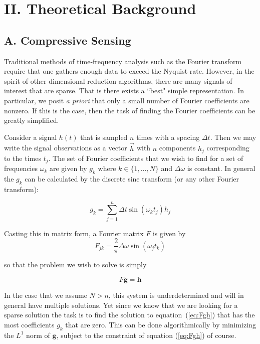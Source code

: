 \documentclass[11pt]{article}
\begin{document}

\section*{II.	Theoretical Background}	%
\subsection*{A.	Compressive Sensing}	%

\par Traditional methods of time-frequency analysis such as the Fourier transform require that one gathers enough data to exceed the Nyquist rate. However, in the spirit of other dimensional reduction algorithms, there are many signals of interest that are sparse. That is there exists a ``best" simple representation. In particular, we posit \textit{a priori} that only a small number of Fourier coefficients are nonzero. If this is the case, then the task of finding the Fourier coefficients can be greatly simplified. \\

\par Consider a signal $h(t)$ that is sampled $n$ times with a spacing $\Delta t$. Then we may write the signal observations as a vector $\vec{h}$ with $n$ components $h_{j}$ corresponding to the times $t_{j}$. The set of Fourier coefficients that we wish to find for a set of frequencies $\omega_{k}$ are given by $g_{k}$ where $k \in \{1,...,N\}$ and $\Delta \omega$ is constant. In general the $g_{k}$ can be calculated by the discrete sine transform (or any other Fourier transform):

\begin{equation}\label{eq:dst}
    g_{k} = \sum_{j=1}^{n} \Delta t \sin(\omega_{k}t_{j})h_{j}
\end{equation}

Casting this in matrix form, a Fourier matrix $F$ is given by
\begin{equation}\label{eq:idst}
    F_{jk} = \frac{2}{\pi}\Delta \omega \sin(\omega_{j}t_{k})
\end{equation}

so that the problem we wish to solve is simply

\begin{equation}\label{eq:Fgh}
    F \mathbf{g} = \mathbf{h}
\end{equation}

In the case that we assume $N > n$, this system is underdetermined and will in general have multiple solutions. Yet since we know that we are looking for a sparse solution the task is to find the solution to equation~(\ref{eq:Fgh}) that has the most coefficients $g_{k}$ that are zero. This can be done algorithmically by minimizing the $L^{1}$ norm of $\mathbf{g}$, subject to the constraint of equation (\ref{eq:Fgh}) of course. \\
\end{document}
